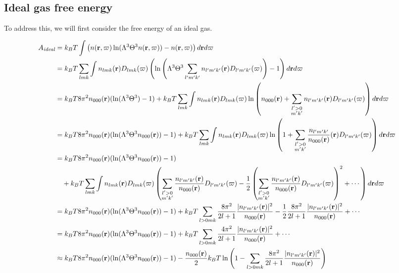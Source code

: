 \documentclass[letterpaper,twocolumn,amsmath,amssymb,pre]{revtex4-1}
\begin{document}
\subsection{Ideal gas free energy}
To address this, we will
first consider the free energy of an ideal gas.
\begin{widetext}
\begin{align}
  A_{\textit{ideal}} &=
  k_BT \int
  \left(n(\mathbf{r},\mathbf{\varpi})\ln(\Lambda^3\Theta^3 n(\mathbf{r},\mathbf{\varpi})) - n(\mathbf{r},\mathbf{\varpi})
  \right) d\mathbf{r} d\mathbf{\varpi} \label{eq:Aideal}
  \\
  &=
  k_BT \sum_{lmk} \int
  n_{lmk}(\mathbf{r})D_{lmk}(\mathbf{\varpi})\left(
  \ln\left(\Lambda^3\Theta^3 \sum_{l'm'k'} n_{l'm'k'}(\mathbf{r})D_{l'm'k'}(\mathbf{\varpi})\right) - 1
  \right) d\mathbf{r} d\mathbf{\varpi}
  \\
  &=
  k_BT 8\pi^2 n_{000}(\mathbf{r})( \ln(\Lambda^3\Theta^3) - 1) +
  k_BT \sum_{lmk} \int
  n_{lmk}(\mathbf{r})D_{lmk}(\mathbf{\varpi})
  \ln\left(n_{000}(\mathbf{r}) + \sum_{\substack{l'>0\\m'k'}} n_{l'm'k'}(\mathbf{r})D_{l'm'k'}(\mathbf{\varpi})\right)
  d\mathbf{r} d\mathbf{\varpi}
  \\
  &=
  k_BT 8\pi^2 n_{000}(\mathbf{r})( \ln(\Lambda^3\Theta^3n_{000}(\mathbf{r})) - 1) +
  k_BT \sum_{lmk} \int
  n_{lmk}(\mathbf{r})D_{lmk}(\mathbf{\varpi})
  \ln\left(1 + \sum_{\substack{l'>0\\m'k'}} \frac{n_{l'm'k'}}{n_{000}(\mathbf{r})}(\mathbf{r})D_{l'm'k'}(\mathbf{\varpi})\right)
  d\mathbf{r} d\mathbf{\varpi}
  \\
  &=
  k_BT 8\pi^2 n_{000}(\mathbf{r})( \ln(\Lambda^3\Theta^3n_{000}(\mathbf{r})) - 1)
  \\&\quad+
  k_BT \sum_{lmk} \int
  n_{lmk}(\mathbf{r})D_{lmk}(\mathbf{\varpi})
  \left(\sum_{\substack{l'>0\\m'k'}}
  \frac{n_{l'm'k'}(\mathbf{r})}{n_{000}(\mathbf{r})}D_{l'm'k'}(\mathbf{\varpi})
  - \frac12 \left(\sum_{\substack{l'>0\\m'k'}}
    \frac{n_{l'm'k'}(\mathbf{r})}{n_{000}(\mathbf{r})}D_{l'm'k'}(\mathbf{\varpi})
  \right)^2
  + \cdots \right)
  d\mathbf{r} d\mathbf{\varpi}
  \\
  &=
  k_BT 8\pi^2 n_{000}(\mathbf{r})( \ln(\Lambda^3\Theta^3n_{000}(\mathbf{r})) - 1)
  +
  k_BT \sum_{l>0mk}
  \frac{8\pi^2}{2l+1}\frac{|n_{l'm'k'}(\mathbf{r})|^2}{n_{000}(\mathbf{r})}
  - \frac12 \frac{8\pi^2}{2l+1}\frac{|n_{l'm'k'}(\mathbf{r})|^2}{n_{000}(\mathbf{r})}
  + \cdots \label{eq:integrated}
  \\
  &=
  k_BT 8\pi^2 n_{000}(\mathbf{r})( \ln(\Lambda^3\Theta^3n_{000}(\mathbf{r})) - 1)
  +
  k_BT \sum_{l>0mk}
  \frac{4\pi^2}{2l+1}\frac{|n_{l'm'k'}(\mathbf{r})|^2}{n_{000}(\mathbf{r})}
  + \cdots \\
  &\approx
  k_BT 8\pi^2 n_{000}(\mathbf{r})( \ln(\Lambda^3\Theta^3n_{000}(\mathbf{r})) - 1)
  -
  \frac{n_{000}(\mathbf{r})}{2}k_BT \ln\left(1 - \sum_{l>0mk}
  \frac{8\pi^2}{2l+1}\frac{|n_{l'm'k'}(\mathbf{r})|^2}{n_{000}(\mathbf{r})}
  \right) \label{eq:approxideal}
\end{align}
\end{widetext}
\end{document}

